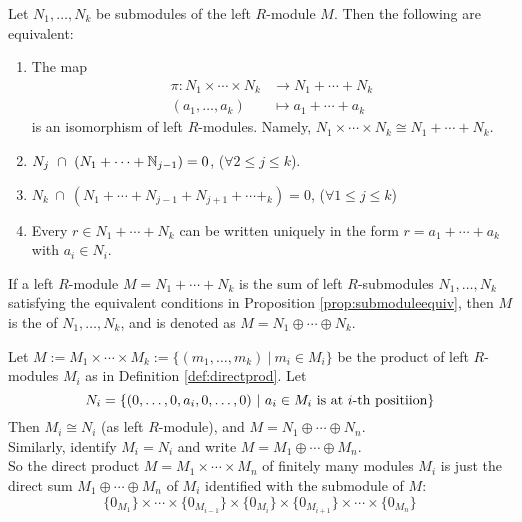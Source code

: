 \begin{proposition}
\label{prop:submoduleequiv}
Let $N_1, \ldots, N_k$ be submodules of the left $R$-module $M$. Then the following are equivalent:
\begin{enumerate}[label=(\roman*)]
\item The map
\begin{align}
\pi : N_1 \times \cdots \times N_k &\rightarrow N_1 + \cdots + N_k \nonumber \\
(a_1, \ldots, a_k) &\mapsto a_1 + \cdots + a_k \nonumber
\end{align}
is an isomorphism of left $R$-modules. Namely, $N_1 \times \cdots \times N_k \cong N_1 + \cdots + N_k$.
\item $N_j \ \cap \ (N_1 + \cdots + \mathbb{N}_{j-1}) = 0$, ($\forall 2 \leq j \leq k$).
\item $N_k \ \cap \ (N_1 + \cdots + N_{j-1} + N_{j+1} + \cdots + _k) = 0$, ($\forall 1 \leq j \leq k$)
\item Every $r \in N_1 + \cdots + N_k$ can be written uniquely in the form $r = a_1 + \cdots + a_k$ with $a_i \in N_i$.
\end{enumerate}
\end{proposition}

\begin{definition}
If a left $R$-module $M=N_1 + \cdots + N_k$ is the sum of left $R$-submodules $N_1, \ldots, N_k$ satisfying the equivalent conditions in Proposition \ref{prop:submoduleequiv}, then $M$ is the  of $N_1, \ldots, N_k$, and is denoted as $M = N_1 \oplus \cdots \oplus N_k$.
\end{definition}

\begin{remark}
Let $M := M_1 \times \cdots \times M_k := \{(m_1, \ldots, m_k) \ | \ m_i \in M_i\}$ be the product of left $R$-modules $M_i$ as in Definition \ref{def:directprod}. Let
\begin{equation}
N_i = \{(0, \ldots, 0, a_i, 0, \ldots, 0) \ | \ a_i \in M_i \textnormal{ is at $i$-th positiion}\} \nonumber
\end{equation}
Then $M_i \cong N_i$ (as left $R$-module), and $M = N_1 \oplus \cdots \oplus N_n$.\\
Similarly, identify $M_i = N_i$ and write $M = M_1 \oplus \cdots \oplus M_n$.\\
So the direct product $M=M_1 \times \cdots \times M_n$ of finitely many modules $M_i$ is just the direct sum $M_1 \oplus \cdots \oplus M_n$ of $M_i$ identified with the submodule of $M$:
\begin{equation}
\{0_{M_1}\} \times \cdots \times \{0_{M_{i-1}}\} \times \{0_{M_i}\} \times \{0_{M_{i+1}}\} \times \cdots \times \{0_{M_n}\} \nonumber
\end{equation}
\end{remark}

